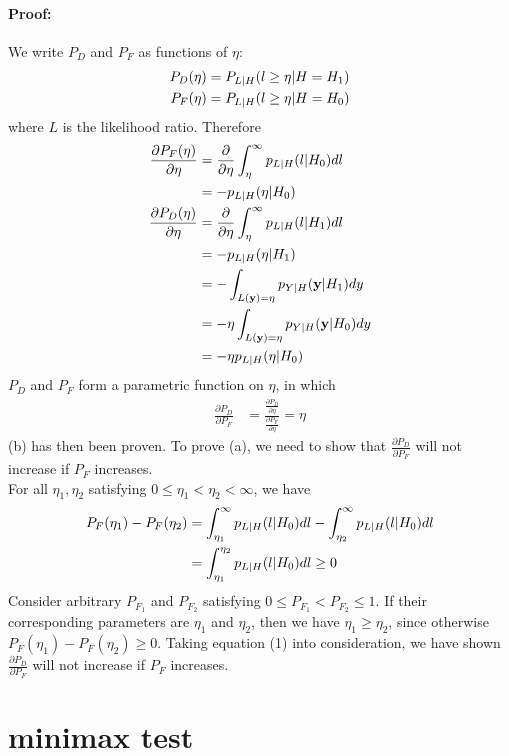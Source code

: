 \documentclass{article}
\begin{document}
\paragraph{Proof:}
We write $P_D$ and $P_F$ as functions of $\eta$:
\begin{align}
	P_D(\eta)&=P_{L|H}(l\ge \eta|H=H_1)\notag\\
	P_F(\eta)&=P_{L|H}(l\ge \eta|H=H_0)\notag
\end{align}
where $L$ is the likelihood ratio. Therefore
\begin{align}
	\frac{\partial P_F(\eta)}{\partial \eta}&=\frac{\partial}{\partial \eta}\int^{\infty}_{\eta}p_{L|H}(l|H_0)dl\notag\\
	&=-p_{L|H}(\eta|H_0)\notag\\
	\frac{\partial P_D(\eta)}{\partial \eta}&=\frac{\partial}{\partial \eta}\int^{\infty}_{\eta}p_{L|H}(l|H_1)dl\notag\\
	&=-p_{L|H}(\eta|H_1)\notag\\
	&=-\int_{L(\mathbf{y})=\eta}p_{Y|H}(\mathbf{y}|H_1)dy\notag\\
	&=-\eta\int_{L(\mathbf{y})=\eta}p_{Y|H}(\mathbf{y}|H_0)dy\notag\\
	&=-\eta p_{L|H}(\eta|H_0)\notag
\end{align}
$P_D$ and $P_F$ form a parametric function on $\eta$, in which
\begin{align}
	\frac{\partial P_D}{\partial P_F}&=\frac{\frac{\partial P_D}{\partial \eta}}{\frac{\partial P_F}{\partial \eta}}=\eta
\end{align}
(b) has then been proven. To prove (a), we need to show that $\frac{\partial P_D}{\partial P_F}$ will not increase if $P_F$ increases.\\
For all $\eta_1, \eta_2$ satisfying $0\le \eta_1< \eta_2< \infty$, we have
\begin{align}
	P_F(\eta_1)-P_F(\eta_2)&=\int^{\infty}_{\eta_1}p_{L|H}(l|H_0)dl-\int^{\infty}_{\eta_2}p_{L|H}(l|H_0)dl\notag\\
	&=\int^{\eta_2}_{\eta_1}p_{L|H}(l|H_0)dl\ge 0\notag
\end{align}
Consider arbitrary $P_{F_1}$ and $P_{F_2}$ satisfying $0\le P_{F_1} < P_{F_2}\le 1$. If their corresponding parameters are $\eta_1$ and $\eta_2$, then we have $\eta_1\ge \eta_2$, since otherwise $P_F(\eta_1)-P_F(\eta_2)\ge 0$. Taking equation (1) into consideration, we have shown $\frac{\partial P_D}{\partial P_F}$ will not increase if $P_F$ increases.

\section{minimax test}
\end{document}
